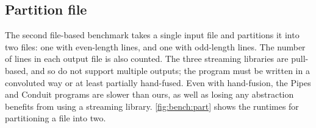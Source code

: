 \subsection{Partition file}
The second file-based benchmark takes a single input file and partitions it into two files: one with even-length lines, and one with odd-length lines.
The number of lines in each output file is also counted.
The three streaming libraries are pull-based, and so do not support multiple outputs; the program must be written in a convoluted way or at least partially hand-fused.
Even with hand-fusion, the Pipes and Conduit programs are slower than ours, as well as losing any abstraction benefits from using a streaming library.
\autoref{fig:bench:part} shows the runtimes for partitioning a file into two.
